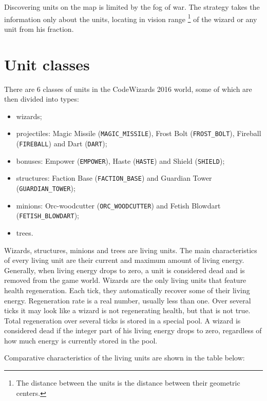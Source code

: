 Discovering units on the map is limited by the fog of war. The strategy takes the information only about the units,
locating in vision range \footnote[4]{The distance between the units is the distance between their geometric centers.}
of the wizard or any unit from his fraction.

\section{Unit classes}

There are $6$ classes of units in the CodeWizards 2016 world, some of which are then divided into types:
\begin{itemize}
            \item wizards;
            \item projectiles: Magic Missile (\texttt{MAGIC\_MISSILE}), Frost Bolt (\texttt{FROST\_BOLT}), Fireball (\texttt{FIREBALL}) and
            Dart (\texttt{DART});
            \item bonuses: Empower (\texttt{EMPOWER}), Haste (\texttt{HASTE}) and Shield (\texttt{SHIELD});
            \item structures: Faction Base (\texttt{FACTION\_BASE}) and Guardian Tower (\texttt{GUARDIAN\_TOWER});
            \item minions: Orc-woodcutter (\texttt{ORC\_WOODCUTTER}) and Fetish Blowdart (\texttt{FETISH\_BLOWDART});
            \item trees.
\end{itemize}
 
Wizards, structures, minions and trees are living units. The main characteristics of every living unit are their current and
maximum amount of living energy. Generally, when living energy drops to zero, a unit is considered dead and
is removed from the game world. Wizards are the only living units that feature health regeneration. Each tick, they automatically
recover some of their living energy. Regeneration rate is a real number, usually less than one.
Over several ticks it may look like a wizard is not regenerating health, but that is not true. Total regeneration over
several ticks is stored in a special pool. A wizard is considered dead if the integer part of his living energy drops to
zero, regardless of how much energy is currently stored in the pool.
 
Comparative characteristics of the living units are shown in the table below:

